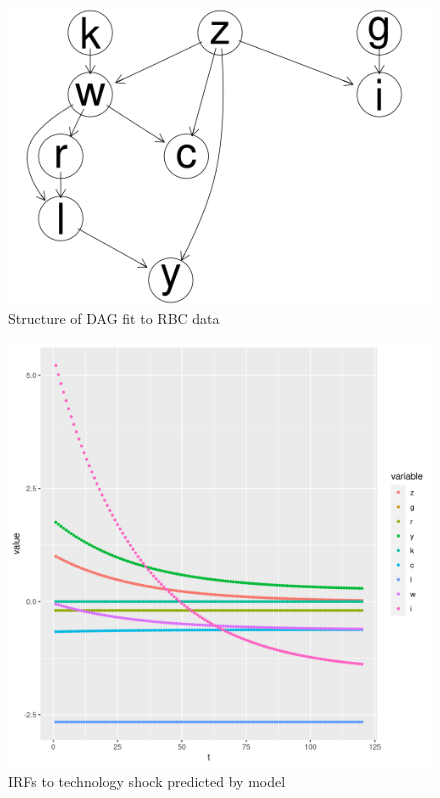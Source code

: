 \documentclass{article}
\begin{document}
\begin{figure}
  \centering
  \includegraphics[width=\textwidth, height=0.25\textheight, keepaspectratio]{images/rbc_dag.png}
  \caption{Structure of DAG fit to RBC data}
  \label{rbcdag}
\end{figure}

\begin{figure}
  \centering
  \includegraphics[width=\textwidth, height=0.4\textheight, keepaspectratio]{images/rbc_irf.png}
  \caption{IRFs to technology shock predicted by model}
  \label{rbcirf}
\end{figure}
\end{document}
